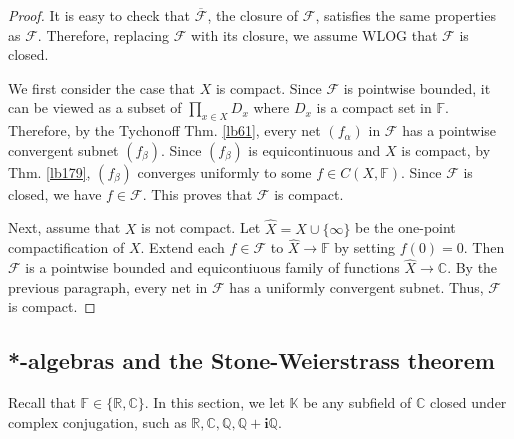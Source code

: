 \documentclass[12pt,b5paper,notitlepage]{article}
\theoremstyle{definition}
\theoremstyle{plain}
\newcommand{\wht}{\widehat}
\newcommand{\ovl}{\overline}
\newcommand{\scr}{\mathscr}
\newcommand{\im}{\mathbf{i}}
\newcommand{\Kbb}{\mathbb K}
\newcommand{\Cbb}{\mathbb C}
\newcommand{\Qbb}{\mathbb Q}
\newcommand{\Rbb}{\mathbb R}
\newcommand{\Fbb}{\mathbb F}
\numberwithin{equation}{section}
\begin{document}
\begin{proof}
It is easy to check that $\ovl{\scr F}$, the closure of $\scr F$, satisfies the same properties as $\scr F$. Therefore, replacing $\scr F$ with its closure, we assume WLOG that $\scr F$ is closed. 

We first consider the case that $X$ is compact. Since $\scr F$ is pointwise bounded, it can be viewed as a subset of $\prod_{x\in X}D_x$ where $D_x$ is a compact set in $\Fbb$. Therefore, by the Tychonoff Thm. \ref{lb61}, every net $(f_\alpha)$ in $\scr F$ has a pointwise convergent subnet $(f_\beta)$. Since $(f_\beta)$ is equicontinuous and $X$ is compact, by Thm. \ref{lb179}, $(f_\beta)$ converges uniformly to some $f\in C(X,\Fbb)$. Since $\scr F$ is closed, we have $f\in\scr F$. This proves that $\scr F$ is compact.

Next, assume that $X$ is not compact. Let $\wht X=X\cup\{\infty\}$ be the one-point compactification of $X$. Extend each $f\in\scr F$ to $\wht X\rightarrow\Fbb$ by setting $f(0)=0$. Then $\scr F$ is a pointwise bounded and equicontiuous family of functions $\wht X\rightarrow\Cbb$. By the previous paragraph, every net in $\scr F$ has a uniformly convergent subnet. Thus, $\scr F$ is compact.
\end{proof}






\subsection{*-algebras and the Stone-Weierstrass theorem}


Recall that $\Fbb\in\{\Rbb,\Cbb\}$. In this section, we let $\Kbb$ be any subfield of $\Cbb$ closed under complex conjugation, such as $\Rbb,\Cbb,\Qbb,\Qbb+\im\Qbb$.
\end{document}
